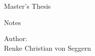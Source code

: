 \begin{titlepage}

\begin{center}

\vspace*{5cm}

{\LARGE Master’s Thesis \\}
{\Large  Notes \par}

\vspace{2cm}

{\large Author: \\ Renke Christian von Seggern \par}

\vspace{2cm}


\vspace{0.5cm}


\vspace{0.5cm}


\end{center}

\end{titlepage}

